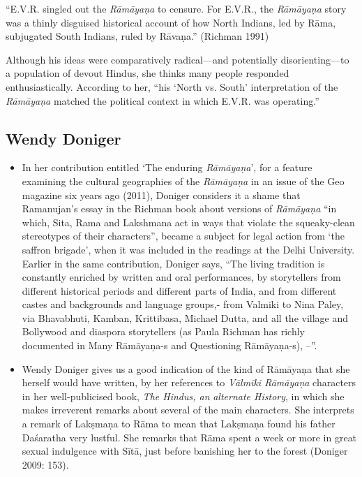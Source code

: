 \begin{myquote}
“E.V.R. singled out the \textit{Rāmāyaṇa} to censure. For E.V.R., the \textit{Rāmāyaṇa} story was a thinly disguised historical account of how North Indians, led by Rāma, subjugated South Indians, ruled by Rāvaṇa.” (Richman 1991)
\end{myquote}

Although his ideas were comparatively radical—and potentially disorienting—to a population of devout Hindus, she thinks many people responded enthusiastically. According to her, “his ‘North vs. South’ interpretation of the \textit{Rāmāyaṇa} matched the political context in which E.V.R. was operating.”

\newpage

\subsection*{Wendy Doniger}

\begin{itemize}
\item In her contribution entitled ‘The enduring \textit{Rāmāyaṇa}’, for a feature examining the cultural geographies of the \textit{Rāmāyaṇa} in an issue of the Geo magazine six years ago (2011), Doniger considers it a shame that Ramanujan’s essay in the Richman book about versions of \textit{Rāmāyaṇa} “in which, Sita, Rama and Lakshmana act in ways that violate the squeaky-clean stereotypes of their characters”, became a subject for legal action from ‘the saffron brigade’, when it was included in the readings at the Delhi University. Earlier in the same contribution, Doniger says, “The living tradition is constantly enriched by written and oral performances, by storytellers from different historical periods and different parts of India, and from different castes and backgrounds and language groups,- from Valmiki to Nina Paley, via Bhavabhuti, Kamban, Krittibasa, Michael Dutta, and all the village and Bollywood and diaspora storytellers (as Paula Richman has richly documented in Many Rāmāyaņa-s and Questioning Rāmāyaņa-s), --”.

 \item Wendy Doniger gives us a good indication of the kind of Rāmāyaņa that she herself would have written, by her references to \textit{Vālmīki Rāmāyaņa} characters in her well-publicised book, \textit{The Hindus, an} \textit{alternate History}, in which she makes irreverent remarks about several of the main characters. She interprets a remark of Lakṣmaṇa to Rāma to mean that Lakṣmaṇa found his father Daśaratha very lustful. She remarks that Rāma spent a week or more in great sexual indulgence with Sītā, just before banishing her to the forest (Doniger 2009: 153).

\end{itemize}



